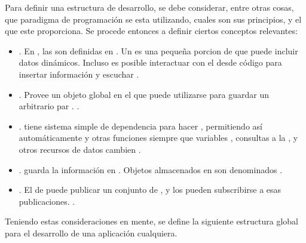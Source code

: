 Para definir una estructura de desarrollo, se debe considerar, entre otras cosas,  que paradigma de programación se esta utilizando, cuales son sus principios, y el \apiAS que este proporciona. Se procede entonces a definir ciertos conceptos relevantes:

	\begin{itemize}
		\item
			\textbf{\templatesMETEOR}. En \meteorNAME, las \viewsAS son definidas en \templatesMETEOR. Un \templateMETEOR es una pequeña porcion de \htmlNAME que puede incluir datos dinámicos. Incluso es posible interactuar con el \templateMETEOR desde código \javaScriptNAME para insertar información y escuchar \events \cite{online_meteor_documentation}.
		\item
			\textbf{\sessionMETEOR}. Provee un objeto global en el \clientAS que puede utilizarse para guardar un arbitrario par \keyValueDB. \cite{online_meteor_documentation}.
		\item
			\textbf{\trackerMETEOR}. \meteorNAME tiene sistema simple de dependencia para hacer \trackingMETEOR, permitiendo así automáticamente \rerunCPT \templatesMETEOR y otras funciones siempre que variables \sessionMETEOR, consultas a la \dataBaseDB, y otros recursos de datos cambien \cite{online_meteor_documentation}.
		\item
			\textbf{\collectionsMETEOR}. \meteorNAME guarda la información en \collectionsMETEOR. Objetos \javaScriptNAME almacenados en \collectionsMETEOR son denominados \documentsDB \cite{online_meteor_documentation}.

		\item
			\textbf{\publishsubscribeMETEOR}. El \serverAS de \meteorNAME puede publicar un conjunto de \documentsDB , y los \clientsAS pueden subscribirse a esas publicaciones. \cite{online_meteor_documentation}.
	\end{itemize}

Teniendo estas consideraciones en mente, se define la siguiente estructura global para el desarrollo de una aplicación cualquiera.





